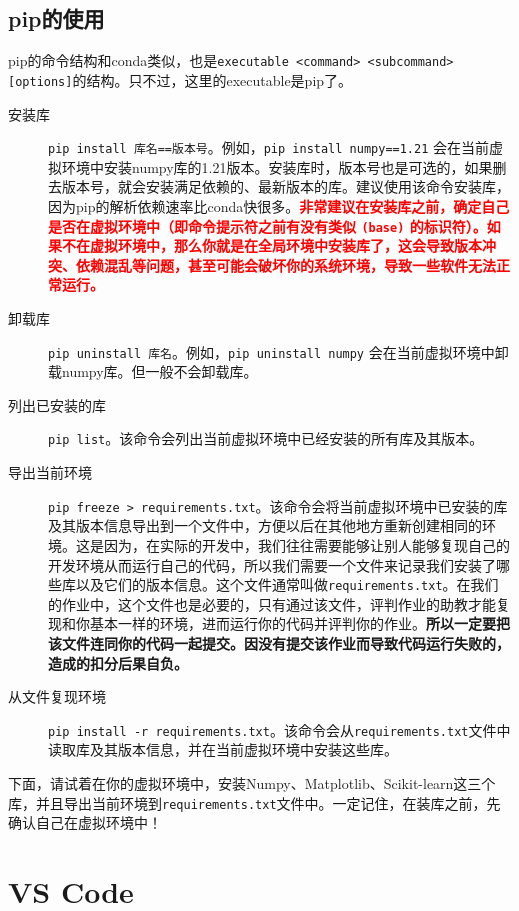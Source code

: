 \documentclass[12pt]{ctexart}
\begin{document}
\subsection{pip的使用}

pip的命令结构和conda类似，也是\texttt{executable <command> <subcommand> [options]}的结构。只不过，这里的executable是pip了。

\begin{description}
    \item[安装库] \texttt{pip install 库名==版本号}。例如，\texttt{pip install numpy==1.21} 会在当前虚拟环境中安装numpy库的1.21版本。安装库时，版本号也是可选的，如果删去版本号，就会安装满足依赖的、最新版本的库。建议使用该命令安装库，因为pip的解析依赖速率比conda快很多。\textcolor{red}{\textbf{非常建议在安装库之前，确定自己是否在虚拟环境中（即命令提示符之前有没有类似 \texttt{(base)} 的标识符）。如果不在虚拟环境中，那么你就是在全局环境中安装库了，这会导致版本冲突、依赖混乱等问题，甚至可能会破坏你的系统环境，导致一些软件无法正常运行。}}
    \item[卸载库] \texttt{pip uninstall 库名}。例如，\texttt{pip uninstall numpy} 会在当前虚拟环境中卸载numpy库。但一般不会卸载库。
    \item[列出已安装的库] \texttt{pip list}。该命令会列出当前虚拟环境中已经安装的所有库及其版本。
    \item[导出当前环境] \texttt{pip freeze > requirements.txt}。该命令会将当前虚拟环境中已安装的库及其版本信息导出到一个文件中，方便以后在其他地方重新创建相同的环境。这是因为，在实际的开发中，我们往往需要能够让别人能够复现自己的开发环境从而运行自己的代码，所以我们需要一个文件来记录我们安装了哪些库以及它们的版本信息。这个文件通常叫做\texttt{requirements.txt}。在我们的作业中，这个文件也是必要的，只有通过该文件，评判作业的助教才能复现和你基本一样的环境，进而运行你的代码并评判你的作业。\textbf{所以一定要把该文件连同你的代码一起提交。因没有提交该作业而导致代码运行失败的，造成的扣分后果自负。}
    \item[从文件复现环境] \texttt{pip install -r requirements.txt}。该命令会从\texttt{requirements.txt}文件中读取库及其版本信息，并在当前虚拟环境中安装这些库。
\end{description}

下面，请试着在你的虚拟环境中，安装Numpy、Matplotlib、Scikit-learn这三个库，并且导出当前环境到\texttt{requirements.txt}文件中。一定记住，在装库之前，先确认自己在虚拟环境中！

\section{VS Code}
\end{document}
